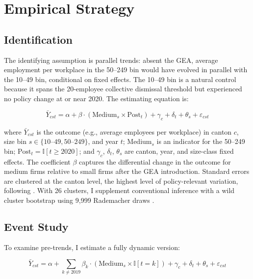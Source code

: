 \documentclass[12pt]{article}
\newcommand{\ind}{\mathbb{I}}
\begin{document}



\section{Empirical Strategy}

\subsection{Identification}

The identifying assumption is parallel trends: absent the GEA, average employment per workplace in the 50--249 bin would have evolved in parallel with the 10--49 bin, conditional on fixed effects. The 10--49 bin is a natural control because it spans the 20-employee collective dismissal threshold but experienced no policy change at or near 2020. The estimating equation is:

\begin{equation}
\bar{Y}_{cst} = \alpha + \beta \cdot (\text{Medium}_s \times \text{Post}_t) + \gamma_c + \delta_t + \theta_s + \varepsilon_{cst}
\label{eq:did}
\end{equation}

\noindent where $\bar{Y}_{cst}$ is the outcome (e.g., average employees per workplace) in canton $c$, size bin $s \in \{10\text{--}49, 50\text{--}249\}$, and year $t$; $\text{Medium}_s$ is an indicator for the 50--249 bin; $\text{Post}_t = \ind[t \geq 2020]$; and $\gamma_c$, $\delta_t$, $\theta_s$ are canton, year, and size-class fixed effects. The coefficient $\beta$ captures the differential change in the outcome for medium firms relative to small firms after the GEA introduction. Standard errors are clustered at the canton level, the highest level of policy-relevant variation, following \citet{bertrand2004much}. With 26 clusters, I supplement conventional inference with a wild cluster bootstrap using 9,999 Rademacher draws \citep{cameron2008bootstrap}.

\subsection{Event Study}

To examine pre-trends, I estimate a fully dynamic version:

\begin{equation}
\bar{Y}_{cst} = \alpha + \sum_{k \neq 2019} \beta_k \cdot (\text{Medium}_s \times \ind[t = k]) + \gamma_c + \delta_t + \theta_s + \varepsilon_{cst}
\label{eq:eventstudy}
\end{equation}
\end{document}
